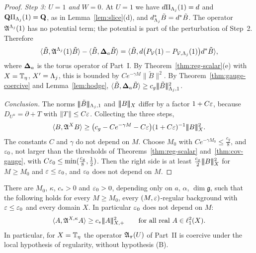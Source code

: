 \begin{proof}
\emph{Step 3: $U=1$ and $W=0$.} At $U=1$ we have $d\Pi_{\Lambda_j}(1)=d$ and $\mathbf Q\Pi_{\Lambda_j}(1)=\mathbf Q$, as in Lemma~\ref{lem:slice}(d), and $d^*_{\Lambda_j}\tilde B=d^*\tilde B$. The operator $\mathfrak A^{\Lambda_j}(1)$ has no potential term; the potential is part of the perturbation of Step~2. Therefore
\[
\langle \tilde B,\mathfrak A^{\Lambda_j}(1)\tilde B\rangle-\langle \tilde B,\boldsymbol{\Delta}_a\tilde B\rangle=\langle \tilde B,d\big(P_\mathcal V(1)-P_{\mathcal V,\Lambda_j}(1)\big)d^*\tilde B\rangle,
\]
where $\boldsymbol{\Delta}_a$ is the torus operator of Part~I. By Theorem~\ref{thm:reg-scalar}(e) with $X=\mathbb T_\eta$, $X'=\Lambda_j$, this is bounded by $Ce^{-\gamma M}\|\tilde B\|^2$. By Theorem~\ref{thm:gauge-coercive} and Lemma~\ref{lem:hodge}, $\langle \tilde B,\boldsymbol{\Delta}_a\tilde B\rangle\ge c_g|\!|\!|\tilde B|\!|\!|^2_{\Lambda_j,1}$.

\emph{Conclusion.} The norms $|\!|\!|\tilde B|\!|\!|_{\Lambda_j,1}$ and $|\!|\!|B|\!|\!|_X$ differ by a factor $1+C\varepsilon$, because $D_{U^u}=\partial+T$ with $\|T\|\le C\varepsilon$. Collecting the three steps,
\[
\langle B,\mathfrak A^XB\rangle\ge\big(c_g-Ce^{-\gamma M}-C\varepsilon\big)(1+C\varepsilon)^{-1}|\!|\!|B|\!|\!|_X^2 .
\]
The constants $C$ and $\gamma$ do not depend on $M$. Choose $M_0$ with $Ce^{-\gamma M_0}\le\frac{c_g}8$, and $\varepsilon_0$, not larger than the thresholds of Theorems~\ref{thm:reg-scalar} and~\ref{thm:cov-gauge}, with $C\varepsilon_0\le\min(\frac{c_g}8,\frac12)$. Then the right side is at least $\frac{c_g}2|\!|\!|B|\!|\!|_X^2$ for $M\ge M_0$ and $\varepsilon\le\varepsilon_0$, and $\varepsilon_0$ does not depend on $M$.
\end{proof}

\begin{theorem}\label{thm:reg-coercive}
There are $M_0$, $\kappa$, $c_*>0$ and $\varepsilon_0>0$, depending only on $a$, $\alpha$, $\dim\mathfrak g$, such that the following holds for every $M\ge M_0$, every $(M,\varepsilon)$-regular background with $\varepsilon\le\varepsilon_0$ and every domain $X$. In particular $\varepsilon_0$ does not depend on $M$:
\[
\langle A,\mathfrak A^{X,\kappa}A\rangle\ge c_*|\!|\!|A|\!|\!|_{X,+}^2\qquad\text{for all real }A\in\ell^2_1(X).
\]
In particular, for $X=\mathbb T_\eta$ the operator $\mathfrak A_\pi(U)$ of Part~II is coercive under the local hypothesis of regularity, without hypothesis (B).
\end{theorem}


